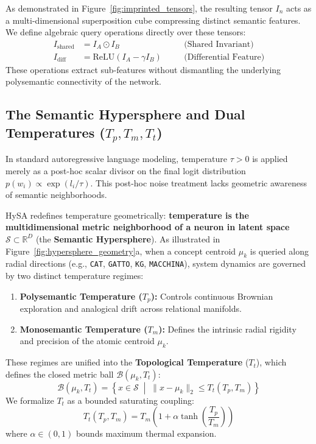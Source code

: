 \documentclass[10pt,twocolumn]{article}
\theoremstyle{definition}
\begin{document}
As demonstrated in Figure~\ref{fig:imprinted_tensors}, the resulting tensor $I_n$ acts as a multi-dimensional superposition cube compressing distinct semantic features. We define algebraic query operations directly over these tensors:
\begin{align}
    I_{\mathrm{shared}} &= I_A \odot I_B \quad &&\text{(Shared Invariant)} \\
    I_{\mathrm{diff}} &= \mathrm{ReLU}(I_A - \gamma I_B) \quad &&\text{(Differential Feature)}
\end{align}
These operations extract sub-features without dismantling the underlying polysemantic connectivity of the network.

\subsection{The Semantic Hypersphere and Dual Temperatures (\texorpdfstring{$T_p, T_m, T_t$}{Tp, Tm, Tt})}
In standard autoregressive language modeling, temperature $\tau > 0$ is applied merely as a post-hoc scalar divisor on the final logit distribution $p(w_i) \propto \exp(l_i / \tau)$. This post-hoc noise treatment lacks geometric awareness of semantic neighborhoods.

HySA redefines temperature geometrically: \textbf{temperature is the multidimensional metric neighborhood of a neuron in latent space $\mathcal{S} \subset \mathbb{R}^D$} (the \textbf{Semantic Hypersphere}). As illustrated in Figure~\ref{fig:hypersphere_geometry}a, when a concept centroid $\mu_k$ is queried along radial directions (e.g., \texttt{CAT}, \texttt{GATTO}, \texttt{KG}, \texttt{MACCHINA}), system dynamics are governed by two distinct temperature regimes:
\begin{enumerate}[leftmargin=*, itemsep=1.5pt]
    \item \textbf{Polysemantic Temperature ($T_p$):} Controls continuous Brownian exploration and analogical drift across relational manifolds.
    \item \textbf{Monosemantic Temperature ($T_m$):} Defines the intrinsic radial rigidity and precision of the atomic centroid $\mu_k$.
\end{enumerate}

These regimes are unified into the \textbf{Topological Temperature} ($T_t$), which defines the closed metric ball $\mathcal{B}(\mu_k, T_t)$:
\begin{equation}
    \mathcal{B}(\mu_k, T_t) = \left\{ x \in \mathcal{S} \;\middle|\; \| x - \mu_k \|_2 \le T_t(T_p, T_m) \right\}
\end{equation}
We formalize $T_t$ as a bounded saturating coupling:
\begin{equation}
    T_t(T_p, T_m) = T_m \left( 1 + \alpha \tanh\left( \frac{T_p}{T_m} \right) \right)
    \label{eq:tt_coupling}
\end{equation}
where $\alpha \in (0, 1)$ bounds maximum thermal expansion.
\end{document}

